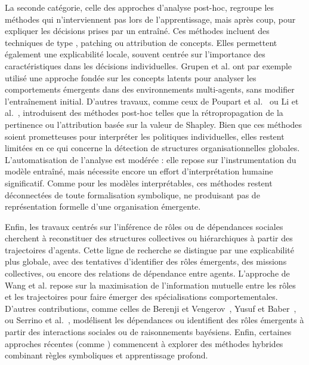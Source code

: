 La seconde catégorie, celle des approches d’analyse post-hoc, regroupe les méthodes qui n'interviennent pas lors de l'apprentissage, mais après coup, pour expliquer les décisions prises par un  entraîné. Ces méthodes incluent des techniques de type , patching ou attribution de concepts. Elles permettent également une explicabilité locale, souvent centrée sur l'importance des caractéristiques dans les décisions individuelles. Grupen et al. \cite{grupen2022concept} ont par exemple utilisé une approche fondée sur les concepts latents pour analyser les comportements émergents dans des environnements multi-agents, sans modifier l'entraînement initial. D'autres travaux, comme ceux de Poupart et al.~\cite{poupart2025perspectives} ou Li et al.~\cite{li2025from}, introduisent des méthodes post-hoc telles que la rétropropagation de la pertinence ou l'attribution basée sur la valeur de Shapley. Bien que ces méthodes soient prometteuses pour interpréter les politiques individuelles, elles restent limitées en ce qui concerne la détection de structures organisationnelles globales. L’automatisation de l’analyse est modérée : elle repose sur l’instrumentation du modèle entraîné, mais nécessite encore un effort d’interprétation humaine significatif. Comme pour les modèles interprétables, ces méthodes restent déconnectées de toute formalisation symbolique, ne produisant pas de représentation formelle d’une organisation émergente.

Enfin, les travaux centrés sur l’inférence de rôles ou de dépendances sociales cherchent à reconstituer des structures collectives ou hiérarchiques à partir des trajectoires d'agents. Cette ligne de recherche se distingue par une explicabilité plus globale, avec des tentatives d’identifier des rôles émergents, des missions collectives, ou encore des relations de dépendance entre agents. L’approche  de Wang et al. \cite{Wang2020} repose sur la maximisation de l’information mutuelle entre les rôles et les trajectoires pour faire émerger des spécialisations comportementales. D'autres contributions, comme celles de Berenji et Vengerov~\cite{berenji2000learning}, Yusuf et Baber~\cite{yusuf2020inferential}, ou Serrino et al.~\cite{serrino2019finding}, modélisent les dépendances ou identifient des rôles émergents à partir des interactions sociales ou de raisonnements bayésiens. Enfin, certaines approches récentes (comme \cite{subramanian2024neurosymbolic}) commencent à explorer des méthodes hybrides combinant règles symboliques et apprentissage profond.

